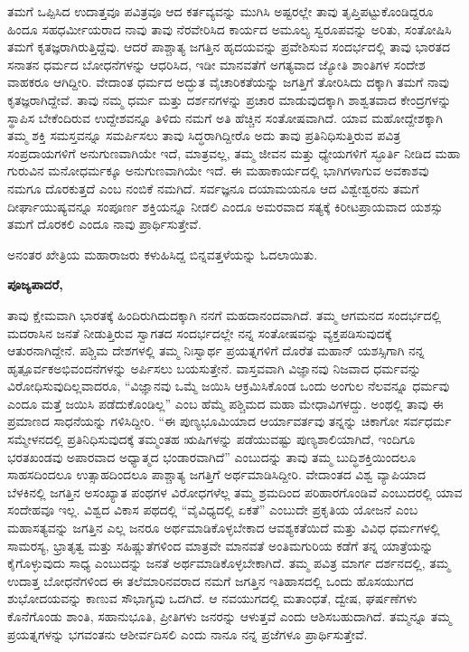 ತಮಗೆ ಒಪ್ಪಿಸಿದ ಉದಾತ್ತವೂ ಪವಿತ್ರವೂ ಆದ ಕರ್ತವ್ಯವನ್ನು ಮುಗಿಸಿ ಅಷ್ಟರಲ್ಲೇ ತಾವು ತೃಪ್ತಿಪಟ್ಟುಕೊಂಡಿದ್ದರೂ ಹಿಂದೂ ಸಹಧರ್ಮೀಯರಾದ ನಾವು ತಾವು ನೆರವೇರಿಸಿದ ಕಾರ್ಯದ ಅಮೂಲ್ಯ ಸ್ವರೂಪವನ್ನು ಅರಿತು, ಸಂತೋಷಿಸಿ ತಮಗೆ ಕೃತಜ್ಞರಾಗಿರುತ್ತಿದ್ದೆವು. ಆದರೆ ಪಾಶ್ಚಾತ್ಯ ಜಗತ್ತಿನ ಹೃದಯವನ್ನು ಪ್ರವೇಶಿಸುವ ಸಂದರ್ಭದಲ್ಲಿ ತಾವು ಭಾರತದ ಸನಾತನ ಧರ್ಮದ ಬೋಧನೆಗಳನ್ನು ಆಧರಿಸಿದ, ಇಡೀ ಮಾನವತೆಗೆ ಅಗತ್ಯವಾದ ಜ್ಯೋತಿ ಶಾಂತಿಗಳ ಸಂದೇಶ ವಾಹಕರೂ ಆಗಿದ್ದೀರಿ. ವೇದಾಂತ ಧರ್ಮದ ಅದ್ಭುತ ವೈಚಾರಿಕತೆಯನ್ನು ಜಗತ್ತಿಗೆ ತೋರಿಸಿದು ದಕ್ಕಾಗಿ ತಮಗೆ ನಾವು ಕೃತಜ್ಞರಾಗಿದ್ದೇವೆ. ತಾವು ನಮ್ಮ ಧರ್ಮ ಮತ್ತು ದರ್ಶನಗಳನ್ನು ಪ್ರಚಾರ ಮಾಡುವುದಕ್ಕಾಗಿ ಶಾಶ್ವತವಾದ ಕೇಂದ್ರಗಳನ್ನು ಸ್ಥಾಪಿಸ ಬೇಕೆಂದಿರುವ ಉದ್ದೇಶವನ್ನೂ ತಿಳಿದು ನಮಗೆ ಅತಿ ಹೆಚ್ಚಿನ ಸಂತೋಷವಾಗಿದೆ. ಯಾವ ಮಹೋದ್ದೇಶಕ್ಕಾಗಿ ತಮ್ಮ ಶಕ್ತಿ ಸಮಸ್ತವನ್ನೂ ಸಮರ್ಪಿಸಲು ತಾವು ಸಿದ್ಧರಾಗಿದ್ದೀರೊ ಅದು ತಾವು ಪ್ರತಿನಿಧಿಸುತ್ತಿರುವ ಪವಿತ್ರ ಸಂಪ್ರದಾಯಗಳಿಗೆ ಅನುಗುಣವಾಗಿಯೇ ಇದೆ, ಮಾತ್ರವಲ್ಲ, ತಮ್ಮ ಜೀವನ ಮತ್ತು ಧ್ಯೇಯಗಳಿಗೆ ಸ್ಫೂರ್ತಿ ನೀಡಿದ ಮಹಾ ಗುರುವಿನ ಮನೋಧರ್ಮಕ್ಕೂ ಅನುಗುಣವಾಗಿಯೇ ಇದೆ. ಈ ಮಹಾಕಾರ್ಯದಲ್ಲಿ ಭಾಗಿಗಳಾಗುವ ಅವಕಾಶವು ನಮಗೂ ದೊರಕುತ್ತದೆ ಎಂಬ ನಂಬಿಕೆ ನಮಗಿದೆ. ಸರ್ವಜ್ಞನೂ ದಯಾಮಯನೂ ಆದ ವಿಶ್ವೇಶ್ವರನು ತಮಗೆ ದೀರ್ಘಾಯುಷ್ಯವನ್ನೂ ಸಂಪೂರ್ಣ ಶಕ್ತಿಯನ್ನೂ ನೀಡಲಿ ಎಂದೂ ಅಮರವಾದ ಸತ್ಯಕ್ಕೆ ಕಿರೀಟಪ್ರಾಯವಾದ ಯಶಸ್ಸು ತಮಗೆ ದೊರಕಲಿ ಎಂದೂ ನಾವು ಪ್ರಾರ್ಥಿಸುತ್ತೇವೆ.

ಅನಂತರ ಖೇತ್ರಿಯ ಮಹಾರಾಜರು ಕಳುಹಿಸಿದ್ದ ಬಿನ್ನವತ್ತಳೆಯನ್ನು ಓದಲಾಯಿತು.

\textbf{ಪೂಜ್ಯಪಾದರೆ,}

ತಾವು ಕ್ಷೇಮವಾಗಿ ಭಾರತಕ್ಕೆ ಹಿಂದಿರುಗಿದುದಕ್ಕಾಗಿ ನನಗೆ ಮಹದಾನಂದವಾಗಿದೆ. ತಮ್ಮ ಆಗಮನದ ಸಂದರ್ಭದಲ್ಲಿ ಮದರಾಸಿನ ಜನತೆ ನೀಡುತ್ತಿರುವ ಸ್ವಾಗತದ ಸಂದರ್ಭದಲ್ಲೇ ನನ್ನ ಸಂತೋಷವನ್ನು ವ್ಯಕ್ತಪಡಿಸುವುದಕ್ಕೆ ಆತುರನಾಗಿದ್ದೇನೆ. ಪಶ್ಚಿಮ ದೇಶಗಳಲ್ಲಿ ತಮ್ಮ ನಿಃಸ್ವಾರ್ಥ ಪ್ರಯತ್ನಗಳಿಗೆ ದೊರೆತ ಮಹಾನ್​ ಯಶಸ್ಸಿಗಾಗಿ ನನ್ನ ಹೃತ್ಪೂರ್ವಕ\break ಅಭಿವಂದನೆಗಳನ್ನು ಅರ್ಪಿಸಲು ಬಯಸುತ್ತೇನೆ. ವಾಸ್ತವವಾಗಿ ವಿಜ್ಞಾನವು ನಿಜವಾದ ಧರ್ಮವನ್ನು ವಿರೋಧಿಸುವುದಿಲ್ಲವಾದರೂ, “ವಿಜ್ಞಾನವು ಒಮ್ಮೆ ಜಯಿಸಿ ಆಕ್ರಮಿಸಿಕೊಂಡ ಒಂದು ಅಂಗುಲ ನೆಲವನ್ನೂ ಧರ್ಮವು ಎಂದೂ ಮತ್ತೆ ಜಯಿಸಿ ಪಡೆದುಕೊಂಡಿಲ್ಲ” ಎಂಬ ಹೆಮ್ಮೆ ಪಶ್ಚಿಮದ ಮಹಾ ಮೇಧಾವಿಗಳದ್ದು. ಅಂಥಲ್ಲಿ ತಾವು ಈ ಪ್ರಮಾಣದ ಸಾಧನೆಯನ್ನು ಗಳಿಸಿದ್ದೀರಿ. “ಈ ಪುಣ್ಯಭೂಮಿಯಾದ ಆರ್ಯಾವರ್ತವು ತನ್ನನ್ನು ಚಿಕಾಗೋ ಸರ್ವಧರ್ಮ ಸಮ್ಮೇಳನದಲ್ಲಿ ಪ್ರತಿನಿಧಿಸುವುದಕ್ಕೆ ತಮ್ಮಂತಹ ಋಷಿಗಳನ್ನು ಪಡೆಯುವಷ್ಟು ಪುಣ್ಯಶಾಲಿಯಾಗಿದೆ, ಇಂದಿಗೂ ಭರತಖಂಡವು ಅಪಾರವಾದ ಅಧ್ಯಾತ್ಮದ ಭಂಡಾರವಾಗಿದೆ” ಎಂಬುದನ್ನು ತಾವು ತಮ್ಮ ಬುದ್ಧಿಶಕ್ತಿಯಿಂದಲೂ ಸಾಹಸದಿಂದಲೂ ಉತ್ಸಾಹದಿಂದಲೂ ಪಾಶ್ಚಾತ್ಯ ಜಗತ್ತಿಗೆ ಅರ್ಥಮಾಡಿಸಿದ್ದೀರಿ. ವೇದಾಂತದ ವಿಶ್ವ ವ್ಯಾಪಿಯಾದ ಬೆಳಕಿನಲ್ಲಿ ಜಗತ್ತಿನ ಅಸಂಖ್ಯಾತ ಪಂಥಗಳ ವಿರೋಧಗಳೆಲ್ಲ ತಮ್ಮ ಶ್ರಮದಿಂದ ಪರಿಹಾರಗೊಂಡಿವೆ ಎಂಬುದರಲ್ಲಿ ಯಾವ ಸಂದೇಹವೂ ಇಲ್ಲ. ವಿಶ್ವದ ವಿಕಾಸ ಪಥದಲ್ಲಿ “ವೈವಿಧ್ಯದಲ್ಲಿ ಏಕತೆ” ಎಂಬುದೇ ಪ್ರಕೃತಿಯ ಯೋಜನೆ ಎಂಬ ಮಹಾಸತ್ಯವನ್ನು ಜಗತ್ತಿನ ಎಲ್ಲ ಜನರೂ ಅರ್ಥಮಾಡಿಕೊಳ್ಳಬೇಕಾದ ಆವಶ್ಯಕತೆಯಿದೆ ಮತ್ತು ವಿವಿಧ ಧರ್ಮಗಳಲ್ಲಿ ಸಾಮರಸ್ಯ, ಭ್ರಾತೃತ್ವ ಮತ್ತು ಸಹಿಷ್ಣುತೆಗಳಿಂದ ಮಾತ್ರವೇ ಮಾನವತೆ ಅಂತಿಮಗುರಿಯ ಕಡೆಗೆ ತನ್ನ ಯಾತ್ರೆಯನ್ನು ಕೈಗೊಳ್ಳುವುದು ಸಾಧ್ಯ ಎಂಬುದನ್ನು ಜನತೆ ಅರ್ಥಮಾಡಿಕೊಳ್ಳಬೇಕಾಗಿದೆ. ತಮ್ಮ ಪವಿತ್ರ ಮಾರ್ಗ ದರ್ಶನದಲ್ಲಿ, ತಮ್ಮ ಉದಾತ್ತ ಬೋಧನೆಗಳಿಂದ ಈ ತಲೆಮಾರಿನವರಾದ ನಮಗೆ ಜಗತ್ತಿನ ಇತಿಹಾಸದಲ್ಲಿ ಒಂದು ಹೊಸಯುಗದ ಶುಭೋದಯವನ್ನು ಕಾಣುವ ಸೌಭಾಗ್ಯವು ಒದಗಿದೆ. ಆ ನವಯುಗದಲ್ಲಿ ಮತಾಂಧತೆ, ದ್ವೇಷ, ಘರ್ಷಣೆಗಳು ಕೊನೆಗೊಂಡು ಶಾಂತಿ, ಸಹಾನುಭೂತಿ, ಪ್ರೀತಿಗಳು ಜನರನ್ನು ಆಳುತ್ತವೆ ಎಂದು ಆಶಿಸಬಹುದಾಗಿದೆ. ತಮ್ಮನ್ನೂ ತಮ್ಮ ಪ್ರಯತ್ನಗಳನ್ನು ಭಗವಂತನು ಆಶೀರ್ವದಿಸಲಿ ಎಂದು ನಾನೂ ನನ್ನ ಪ್ರಜೆಗಳೂ ಪ್ರಾರ್ಥಿಸುತ್ತೇವೆ.

